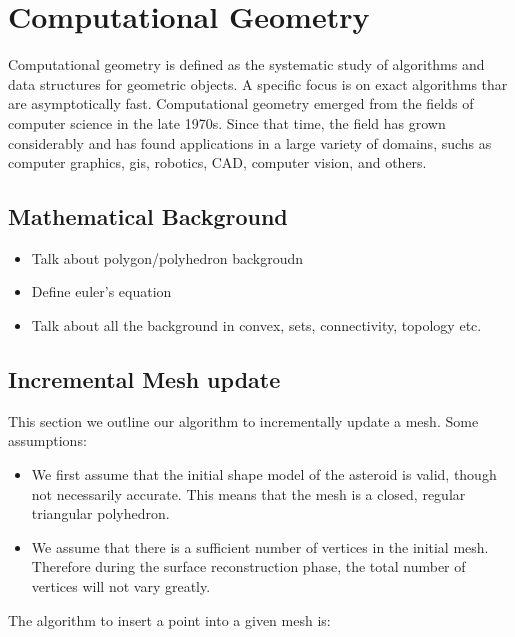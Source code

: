 
\chapter{Computational Geometry}

Computational geometry is defined as the systematic study of algorithms and data structures for geometric objects.
A specific focus is on exact algorithms thar are asymptotically fast.
Computational geometry emerged from the fields of computer science in the late 1970s.
Since that time, the field has grown considerably and has found applications in a large variety of domains, suchs as computer graphics, \gls{gis}, robotics, \gls{CAD}, computer vision, and others.

\section{Mathematical Background}

\begin{itemize}
    \item Talk about polygon/polyhedron backgroudn
    \item Define euler's equation
    \item Talk about all the background in convex, sets, connectivity, topology etc.
\end{itemize}

\section{Incremental Mesh update}

This section we outline our algorithm to incrementally update a mesh. 
Some assumptions:

\begin{itemize}
    \item We first assume that the initial shape model of the asteroid is valid, though not necessarily accurate.
        This means that the mesh is a closed, regular triangular polyhedron.
    \item We assume that there is a sufficient number of vertices in the initial mesh. 
        Therefore during the surface reconstruction phase, the total number of vertices will not vary greatly.
\end{itemize}

The algorithm to insert a point into a given mesh is:

